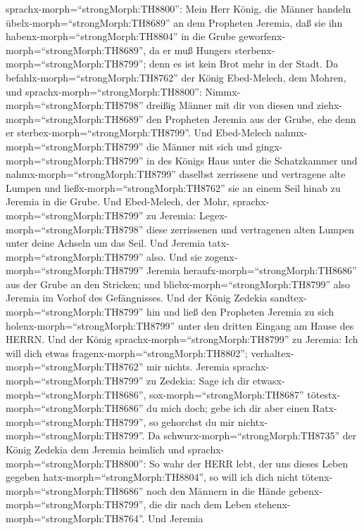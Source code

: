 sprachx-morph=``strongMorph:TH8800'':  Mein Herr König, die
Männer handeln übelx-morph=``strongMorph:TH8689'' an dem Propheten
Jeremia, daß sie ihn habenx-morph=``strongMorph:TH8804'' in die Grube
geworfenx-morph=``strongMorph:TH8689'', da er muß Hungers
sterbenx-morph=``strongMorph:TH8799''; denn es ist kein Brot mehr in der
Stadt.  Da befahlx-morph=``strongMorph:TH8762'' der König
Ebed-Melech, dem Mohren, und sprachx-morph=``strongMorph:TH8800'':
Nimmx-morph=``strongMorph:TH8798'' dreißig Männer mit dir von diesen und
ziehx-morph=``strongMorph:TH8689'' den Propheten Jeremia aus der Grube,
ehe denn er sterbex-morph=``strongMorph:TH8799''.  Und
Ebed-Melech nahmx-morph=``strongMorph:TH8799'' die Männer mit sich und
gingx-morph=``strongMorph:TH8799'' in des Königs Haus unter die
Schatzkammer und nahmx-morph=``strongMorph:TH8799'' daselbst zerrissene
und vertragene alte Lumpen und ließx-morph=``strongMorph:TH8762'' sie an
einem Seil hinab zu Jeremia in die Grube.  Und Ebed-Melech,
der Mohr, sprachx-morph=``strongMorph:TH8799'' zu Jeremia:
Legex-morph=``strongMorph:TH8798'' diese zerrissenen und vertragenen
alten Lumpen unter deine Achseln um das Seil. Und Jeremia
tatx-morph=``strongMorph:TH8799'' also.  Und sie
zogenx-morph=``strongMorph:TH8799'' Jeremia
heraufx-morph=``strongMorph:TH8686'' aus der Grube an den Stricken; und
bliebx-morph=``strongMorph:TH8799'' also Jeremia im Vorhof des
Gefängnisses.  Und der König Zedekia
sandtex-morph=``strongMorph:TH8799'' hin und ließ den Propheten Jeremia
zu sich holenx-morph=``strongMorph:TH8799'' unter den dritten Eingang am
Hause des HERRN. Und der König sprachx-morph=``strongMorph:TH8799'' zu
Jeremia: Ich will dich etwas fragenx-morph=``strongMorph:TH8802'';
verhaltex-morph=``strongMorph:TH8762'' mir nichts.  Jeremia
sprachx-morph=``strongMorph:TH8799'' zu Zedekia: Sage ich dir
etwasx-morph=``strongMorph:TH8686'', sox-morph=``strongMorph:TH8687''
tötestx-morph=``strongMorph:TH8686'' du mich doch; gebe ich dir aber
einen Ratx-morph=``strongMorph:TH8799'', so gehorchst du mir
nichtx-morph=``strongMorph:TH8799''.  Da
schwurx-morph=``strongMorph:TH8735'' der König Zedekia dem Jeremia
heimlich und sprachx-morph=``strongMorph:TH8800'': So wahr der HERR
lebt, der uns dieses Leben gegeben hatx-morph=``strongMorph:TH8804'', so
will ich dich nicht tötenx-morph=``strongMorph:TH8686'' noch den Männern
in die Hände gebenx-morph=``strongMorph:TH8799'', die dir nach dem Leben
stehenx-morph=``strongMorph:TH8764''.  Und Jeremia
